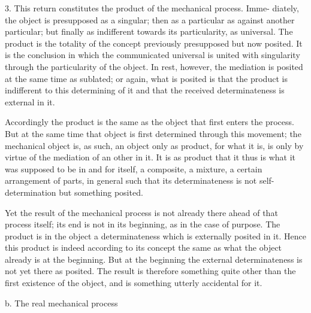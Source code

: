 3. This return constitutes the product of the mechanical process. Imme-
diately, the object is presupposed as a singular; then as a particular as against
another particular; but finally as indifferent towards its particularity, as
universal. The product is the totality of the concept previously presupposed
but now posited. It is the conclusion in which the communicated universal
is united with singularity through the particularity of the object. In rest,
however, the mediation is posited at the same time as sublated; or again,
what is posited is that the product is indifferent to this determining of it
and that the received determinateness is external in it.

Accordingly the product is the same as the object that first enters the
process. But at the same time that object is first determined through this
movement; the mechanical object is, as such, an object only as product,
for what it is, is only by virtue of the mediation of an other in it. It is as
product that it thus is what it was supposed to be in and for itself, a
composite, a mixture, a certain arrangement of parts, in general such that its
determinateness is not self-determination but something posited.

Yet the result of the mechanical process is not already there ahead of that
process itself; its end is not in its beginning, as in the case of purpose. The
product is in the object a determinateness which is externally posited in
it. Hence this product is indeed according to its concept the same as what
the object already is at the beginning. But at the beginning the external
determinateness is not yet there as posited. The result is therefore something
quite other than the first existence of the object, and is something utterly
accidental for it.

b. The real mechanical process

